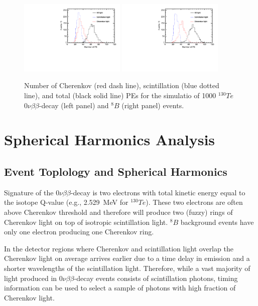 \documentclass[12pt,twoside,letterpaper]{article}
\newcommand{\vbb}{0\nu\beta\beta}
\newcommand{\Te}{^{130}Te}
\newcommand{\B}{^{8}B}
\begin{document}
\begin{figure}[htb]
\centering
\includegraphics[angle=0,width=0.45\textwidth]{plots/hMomNPhot_Te130.pdf}
\includegraphics[angle=0,width=0.45\textwidth]{plots/hMomNPhot_1el_2p529MeV.pdf}
\caption{Number of Cherenkov (red dash line), scintillation (blue dotted line), and total (black solid line) PEs for the simulatio of 1000 $\Te$ $\vbb$-decay (left panel) and $\B$ (right panel) events.}
\label{fig:NPhot}
\end{figure}


\section{Spherical Harmonics Analysis}
\label{sec:spherical_harmonics}

\subsection{Event Toplology and Spherical Harmonics}
\label{sec:topology_and_harmonics}
Signature of the $\vbb$-decay is two electrons with total kinetic energy equal to the isotope Q-value (e.g., 2.529~MeV for $\Te$). These two electrons are often above Cherenkov threshold and therefore will produce two (fuzzy) rings of Cherenkov light on top of isotropic scintillation light. $\B$ background events have only one electron producing one Cherenkov ring.

In the detector regions where Cherenkov and scintillation light overlap the Cherenkov light on average arrives earlier due to a time delay in emission and a shorter wavelengths of the scintillation light. Therefore, while a vast majority of light produced in $\vbb$-decay events consists of scintillation photons, timing information can be used to select a sample of photons with high fraction of Cherenkov light.
\end{document}

